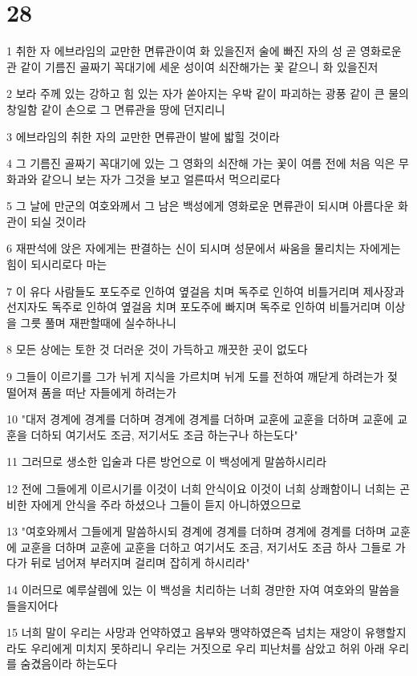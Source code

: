 \chapter{28}

\par 1 취한 자 에브라임의 교만한 면류관이여 화 있을진저 술에 빠진 자의 성 곧 영화로운 관 같이 기름진 골짜기 꼭대기에 세운 성이여 쇠잔해가는 꽃 같으니 화 있을진저
\par 2 보라 주께 있는 강하고 힘 있는 자가 쏟아지는 우박 같이 파괴하는 광풍 같이 큰 물의 창일함 같이 손으로 그 면류관을 땅에 던지리니
\par 3 에브라임의 취한 자의 교만한 면류관이 발에 밟힐 것이라
\par 4 그 기름진 골짜기 꼭대기에 있는 그 영화의 쇠잔해 가는 꽃이 여름 전에 처음 익은 무화과와 같으니 보는 자가 그것을 보고 얼른따서 먹으리로다
\par 5 그 날에 만군의 여호와께서 그 남은 백성에게 영화로운 면류관이 되시며 아름다운 화관이 되실 것이라
\par 6 재판석에 앉은 자에게는 판결하는 신이 되시며 성문에서 싸움을 물리치는 자에게는 힘이 되시리로다 마는
\par 7 이 유다 사람들도 포도주로 인하여 옆걸음 치며 독주로 인하여 비틀거리며 제사장과 선지자도 독주로 인하여 옆걸음 치며 포도주에 빠지며 독주로 인하여 비틀거리며 이상을 그릇 풀며 재판할때에 실수하나니
\par 8 모든 상에는 토한 것 더러운 것이 가득하고 깨끗한 곳이 없도다
\par 9 그들이 이르기를 그가 뉘게 지식을 가르치며 뉘게 도를 전하여 깨닫게 하려는가 젖 떨어져 품을 떠난 자들에게 하려는가
\par 10 "대저 경계에 경계를 더하며 경계에 경계를 더하며 교훈에 교훈을 더하며 교훈에 교훈을 더하되 여기서도 조금, 저기서도 조금 하는구나 하는도다"
\par 11 그러므로 생소한 입술과 다른 방언으로 이 백성에게 말씀하시리라
\par 12 전에 그들에게 이르시기를 이것이 너희 안식이요 이것이 너희 상쾌함이니 너희는 곤비한 자에게 안식을 주라 하셨으나 그들이 듣지 아니하였으므로
\par 13 "여호와께서 그들에게 말씀하시되 경계에 경계를 더하며 경계에 경계를 더하며 교훈에 교훈을 더하며 교훈에 교훈을 더하고 여기서도 조금, 저기서도 조금 하사 그들로 가다가 뒤로 넘어져 부러지며 걸리며 잡히게 하시리라"
\par 14 이러므로 예루살렘에 있는 이 백성을 치리하는 너희 경만한 자여 여호와의 말씀을 들을지어다
\par 15 너희 말이 우리는 사망과 언약하였고 음부와 맹약하였은즉 넘치는 재앙이 유행할지라도 우리에게 미치지 못하리니 우리는 거짓으로 우리 피난처를 삼았고 허위 아래 우리를 숨겼음이라 하는도다

